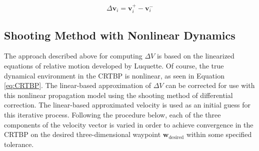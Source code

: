 \documentclass[a4paper]{article}
\begin{document}
\begin{equation} \label{eq:DeltaV}
\Delta \mathbf{v}_i = \mathbf{v}_i^+ - \mathbf{v}_i^-
\end{equation}

\subsection{Shooting Method with Nonlinear Dynamics} \label{sec:shooting}
The approach described above for computing \(\Delta V\) is based on the linearized equations of relative motion developed by Luquette.  Of course, the true dynamical environment in the CRTBP is nonlinear, as seen in Equation \ref{eq:CRTBP}. The linear-based approximation of \(\Delta V\) can be corrected for use with this nonlinear propagation model using the shooting method of differential correction.  The linear-based approximated velocity is used as an initial guess for this iterative process.  Following the procedure below, each of the three components of the velocity vector is varied in order to achieve convergence in the CRTBP on the desired three-dimensional waypoint \(\mathbf{w}_{\mathrm{desired}}\) within some specified tolerance.
\end{document}
